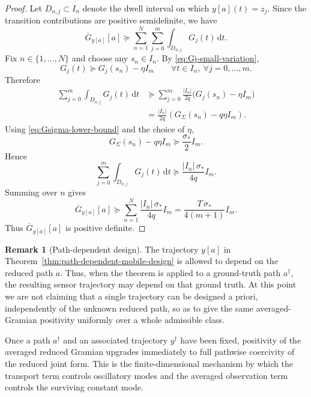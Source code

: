 \documentclass{article}
\theoremstyle{definition}
\newtheorem{remark}[theorem]{Remark}
\renewcommand{\d}{\mathrm{d}}
\begin{document}
\begin{proof}
    Let \(D_{n,j}\subset I_n\) denote the dwell interval on which \(y[a](t)=z_j\). Since the transition
    contributions are positive semidefinite, we have
    \[
        \overline G_{y[a]}[a]
        \succeq
        \sum_{n=1}^N \sum_{j=0}^m \int_{D_{n,j}} G_j(t)\,\d t.
    \]
    Fix \(n\in\{1,\dots,N\}\) and choose any \(s_n\in I_n\). By \eqref{eq:Gj-small-variation},
    \[
        G_j(t)\succeq G_j(s_n)-\eta I_m
        \qquad
        \forall t\in I_n,\ \forall j=0,\dots,m.
    \]
    Therefore
    \begin{align*}
        \sum_{j=0}^m \int_{D_{n,j}} G_j(t)\,\d t
         & \succeq
        \sum_{j=0}^m \frac{|I_n|}{2q}\bigl(G_j(s_n)-\eta I_m\bigr) \\
         & =
        \frac{|I_n|}{2q}
        \left(
        G_\Sigma(s_n)-q\eta I_m
        \right).
    \end{align*}
    Using \eqref{eq:Gsigma-lower-bound} and the choice of \(\eta\),
    \[
        G_\Sigma(s_n)-q\eta I_m
        \succeq
        \frac{\sigma_*}{2} I_m.
    \]
    Hence
    \[
        \sum_{j=0}^m \int_{D_{n,j}} G_j(t)\,\d t
        \succeq
        \frac{|I_n|\,\sigma_*}{4q} I_m.
    \]
    Summing over \(n\) gives
    \[
        \overline G_{y[a]}[a]
        \succeq
        \sum_{n=1}^N \frac{|I_n|\,\sigma_*}{4q} I_m
        =
        \frac{T\,\sigma_*}{4(m+1)} I_m.
    \]
    Thus \(\overline G_{y[a]}[a]\) is positive definite.
\end{proof}

\begin{remark}[Path-dependent design]
    \label{rem:path-dependent-sensor-design}
    The trajectory \(y[a]\) in Theorem~\ref{thm:path-dependent-mobile-design} is allowed to depend
    on the reduced path \(a\). Thus, when the theorem is applied to a ground-truth path
    \(a^\dagger\), the resulting sensor trajectory may depend on that ground truth. At this point we
    are not claiming that a single trajectory can be designed a priori, independently of the unknown
    reduced path, so as to give the same averaged-Gramian positivity uniformly over a whole
    admissible class.
\end{remark}

Once a path \(a^\dagger\) and an associated trajectory \(y^\dagger\) have been fixed, positivity of the
averaged reduced Gramian upgrades immediately to full pathwise coercivity of the reduced joint
form. This is the finite-dimensional mechanism by which the transport term controls oscillatory
modes and the averaged observation term controls the surviving constant mode.
\end{document}
